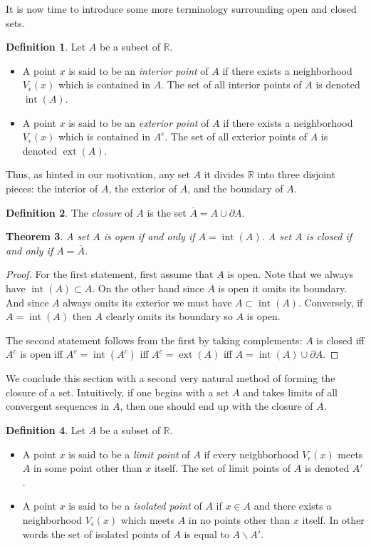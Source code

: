 \documentclass[11pt,oneside]{amsbook}
\newcommand{\RR}{\mathbb R}
\DeclareMathOperator{\inte}{int}
\DeclareMathOperator{\ext}{ext}
\renewcommand{\setminus}{\smallsetminus}
\theoremstyle{definition}
\theoremstyle{plain}
\newtheorem{thm}{Theorem}[section]
\theoremstyle{definition}
\newtheorem{defn}[thm]{Definition}
\theoremstyle{remark}
\numberwithin{equation}{section}
\numberwithin{figure}{section}
\begin{document}
It is now time to introduce some more terminology surrounding open and closed sets.

\begin{defn}
  Let $A$ be a subset of $\RR$.
  \begin{itemize}
  \item A point $x$ is said to be an \emph{interior point} of $A$ if there exists a neighborhood $V_\epsilon(x)$ which is contained in $A$. The set of all interior points of $A$ is denoted $\inte(A)$.
  \item A point $x$ is said to be an \emph{exterior point} of $A$ if there exists a neighborhood $V_\epsilon(x)$ which is contained in $A^c$. The set of all exterior points of $A$ is denoted $\ext(A)$.
  \end{itemize}
\end{defn}

Thus, as hinted in our motivation, any set $A$ it divides $\RR$ into three disjoint pieces: the interior of $A$, the exterior of $A$, and the boundary of $A$.

\begin{defn}
  The \emph{closure} of $A$ is the set $\overline{A}=A\cup\partial A$.
\end{defn}

\begin{thm}
  \label{thm:closure}
  A set $A$ is open if and only if $A=\inte(A)$. A set $A$ is closed if and only if $A=\overline{A}$.
\end{thm}

\begin{proof}
  For the first statement, first assume that $A$ is open. Note that we always have $\inte(A)\subset A$. On the other hand since $A$ is open it omits its boundary. And since $A$ always omits its exterior we must have $A\subset\inte(A)$. Conversely, if $A=\inte(A)$ then $A$ clearly omits its boundary so $A$ is open.

  The second statement follows from the first by taking complements: $A$ is closed iff $A^c$ is open iff $A^c=\inte(A^c)$ iff $A^c=\ext(A)$ iff $A=\inte(A)\cup\partial A$.
\end{proof}

We conclude this section with a second very natural method of forming the closure of a set. Intuitively, if one begins with a set $A$ and takes limits of all convergent sequences in $A$, then one should end up with the closure of $A$.

\begin{defn}
  Let $A$ be a subset of $\RR$.
  \begin{itemize}
  \item A point $x$ is said to be a \emph{limit point} of $A$ if every neighborhood $V_\epsilon(x)$ meets $A$ in some point other than $x$ itself. The set of limit points of $A$ is denoted $A'$.
  \item A point $x$ is said to be a \emph{isolated point} of $A$ if $x\in A$ and there exists a neighborhood $V_\epsilon(x)$ which meets $A$ in no points other than $x$ itself. In other words the set of isolated points of $A$ is equal to $A\setminus A'$.
  \end{itemize}
\end{defn}
\end{document}
